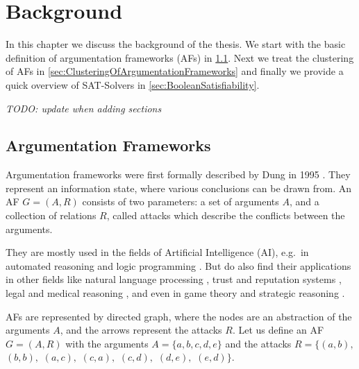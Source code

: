\chapter{Background}
\label{ch:Background}
In this chapter we discuss the background of the thesis. We start with the basic definition of argumentation frameworks (AFs) in \cref{sec:ArgumentationFrameworks}. Next we treat the clustering of AFs in \cref{sec:ClusteringOfArgumentationFrameworks} and finally we provide a quick overview of SAT-Solvers in \cref{sec:BooleanSatisfiability}.

\textit{TODO: update when adding sections}


\section{Argumentation Frameworks}
\label{sec:ArgumentationFrameworks}

Argumentation frameworks were first formally described by Dung in 1995 \cite{DUNG1995321}. They represent an information state, where various conclusions can be drawn from. An AF $G = (A, R)$ consists of two parameters: a set of arguments $A$, and a collection of relations $R$, called attacks which describe the conflicts between the arguments.

They are mostly used in the fields of Artificial Intelligence (AI), e.g.\ in automated reasoning and logic programming \cite{AFINAIARLP, AFINAIARLPexample}. But do also find their applications in other fields like natural language processing \cite{AFINNLP}, trust and reputation systems \cite{AFINTaRS}, legal and medical reasoning \cite{legalAndMedicalReasoning}, and even in game theory and strategic reasoning \cite{AFinGames}.

AFs are represented by directed graph, where the nodes are an abstraction of the arguments $A$, and the arrows represent the attacks $R$. Let us define an AF $G = (A, R)$ with the arguments
$A=\{a, b, c, d, e\}$ and the attacks
$R=\bigl\{(a,b),$
$(b,b),$
$(a,c),$
$(c,a),$
$(c,d),$
$(d,e),$
$(e,d)\bigl\}.$

